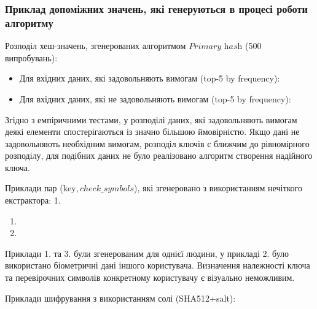 \documentclass[11pt]{article}
\providecommand{\tightlist}{%
      \setlength{\itemsep}{0pt}\setlength{\parskip}{0pt}}
\begin{document}
    \hypertarget{ux43fux440ux438ux43aux43bux430ux434-ux434ux43eux43fux43eux43cux456ux436ux43dux438ux445-ux437ux43dux430ux447ux435ux43dux44c-ux44fux43aux456-ux433ux435ux43dux435ux440ux443ux44eux442ux44cux441ux44f-ux432-ux43fux440ux43eux446ux435ux441ux456-ux440ux43eux431ux43eux442ux438-ux430ux43bux433ux43eux440ux438ux442ux43cux443}{%
\subsubsection{Приклад допоміжних значень, які генеруються в процесі
роботи
алгоритму}\label{ux43fux440ux438ux43aux43bux430ux434-ux434ux43eux43fux43eux43cux456ux436ux43dux438ux445-ux437ux43dux430ux447ux435ux43dux44c-ux44fux43aux456-ux433ux435ux43dux435ux440ux443ux44eux442ux44cux441ux44f-ux432-ux43fux440ux43eux446ux435ux441ux456-ux440ux43eux431ux43eux442ux438-ux430ux43bux433ux43eux440ux438ux442ux43cux443}}

    Розподіл хеш-значень, згенерованих алгоритмом \(\textit{Primary hash}\)
(500 випробувань):

\begin{itemize}
\tightlist
\item
  Для вхідних даних, які задовольняють вимогам (top-5 by frequency):
\item
  Для вхідних даних, які не задовольняють вимогам (top-5 by frequency):
\end{itemize}

Згідно з емпіричними тестами, у розподілі даних, які задовольняють
вимогам деякі елементи спостерігаються із значно більшою ймовірністю.
Якщо дані не задовольняють необхідним вимогам, розподіл ключів є ближчим
до рівномірного розподілу, для подібних даних не було реалізовано
алгоритм створення надійного ключа.

    Приклади пар (\(\text{key},check\_symbols\)), які згенеровано з
використанням нечіткого екстрактора: 1.

\begin{enumerate}
\def\labelenumi{\arabic{enumi}.}
\setcounter{enumi}{1}
\item
\item
\end{enumerate}

Приклади 1. та 3. були згенерованим для однієї людини, у прикладі 2.
було використано біометричні дані іншого користувача. Визначення
належності ключа та перевірочних символів конкретному користувачу є
візуально неможливим.

    Приклади шифрування з використанням солі (SHA512+salt):
\end{document}
